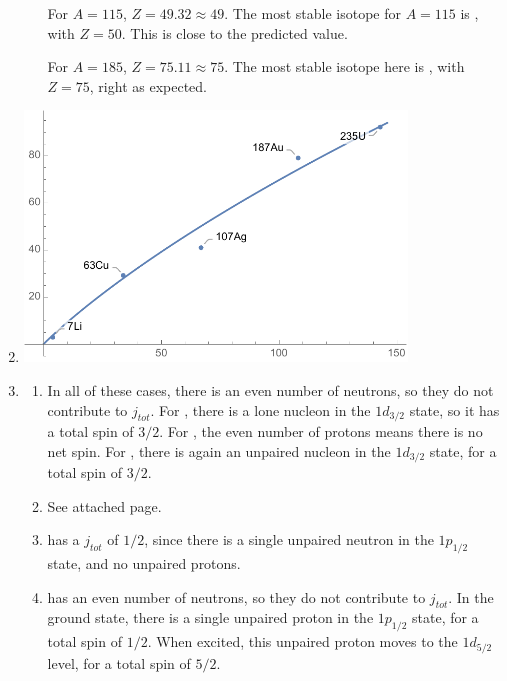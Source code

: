 \documentclass[10pt]{article}
\begin{document}
\begin{enumerate}
\begin{enumerate}
        For $A=115$, $Z=49.32 \approx 49$. The most stable isotope for $A=115$ is , with $Z=50$. This is close to the predicted value.

        For $A=185$, $Z=75.11\approx 75$. The most stable isotope here is , with $Z=75$, right as expected.
    \end{enumerate}

    \item

    \includegraphics[width = 0.8\textwidth] {stabilitychart}

    \item \begin{enumerate}
        \item In all of these cases, there is an even number of neutrons, so they do not contribute to $j_{tot}$. For , there is a lone nucleon in the $1d_{3/2}$ state, so it has a total spin of $3/2$. For , the even number of protons means there is no net spin. For , there is again an unpaired nucleon in the $1d_{3/2}$ state, for a total spin of $3/2$.

        \item See attached page.

        \item {} has a $j_{tot}$ of $1/2$, since there is a single unpaired neutron in the $1p_{1/2}$ state, and no unpaired protons.

        \item {} has an even number of neutrons, so they do not contribute to $j_{tot}$. In the ground state, there is a single unpaired proton in the $1p_{1/2}$ state, for a total spin of $1/2$. When excited, this unpaired proton moves to the $1d_{5/2}$ level, for a total spin of $5/2$.
    \end{enumerate}


\end{enumerate}
\end{document}
